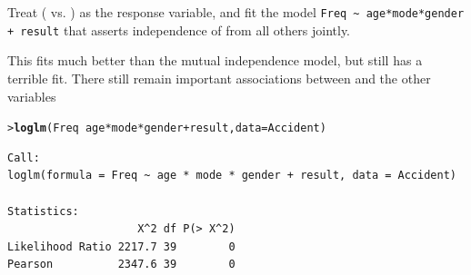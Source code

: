 \documentclass[10pt]{report}\usepackage[]{graphicx}\usepackage[]{color}
\makeatletter
\newcommand{\hlopt}[1]{\textcolor[rgb]{0,0,0}{#1}}%
\newcommand{\hlstd}[1]{\textcolor[rgb]{0.345,0.345,0.345}{#1}}%
\newcommand{\hlkwc}[1]{\textcolor[rgb]{0.333,0.667,0.333}{#1}}%
\newcommand{\hlkwd}[1]{\textcolor[rgb]{0.737,0.353,0.396}{\textbf{#1}}}%
\newenvironment{kframe}{%
 \def\at@end@of@kframe{}%
 \ifinner\ifhmode%
  \def\at@end@of@kframe{\end{minipage}}%
  \begin{minipage}{\columnwidth}%
 \fi\fi%
 \def\FrameCommand##1{\hskip\@totalleftmargin \hskip-\fboxsep
 \colorbox{shadecolor}{##1}\hskip-\fboxsep
     \hskip-\linewidth \hskip-\@totalleftmargin \hskip\columnwidth}%
 \MakeFramed {\advance\hsize-\width
   \@totalleftmargin\z@ \linewidth\hsize
   \@setminipage}}%
 {\par\unskip\endMakeFramed%
 \at@end@of@kframe}
\newenvironment{knitrout}{}{} %
\renewenvironment{knitrout}{\small\renewcommand{\baselinestretch}{.85}}{} %
\makeatother
\begin{document}
\begin{Exercises}
\begin{enumerate*}
\begin{ans}
\begin{knitrout}
\end{knitrout}
      \end{ans}
      
      \item Treat  ( vs. ) as the response variable, and fit the model \newline
      \verb|Freq ~ age*mode*gender + result| that asserts independence of  from all others jointly.
      \begin{ans}
      This fits much better than the mutual independence model, but still has a terrible fit.
      There still remain important associations between  and the other variables
\begin{knitrout}\footnotesize
{}\color{fgcolor}\begin{kframe}
\begin{alltt}
\hlstd{> }\hlkwd{loglm}\hlstd{(Freq} \hlopt{~} \hlstd{age} \hlopt{*} \hlstd{mode} \hlopt{*} \hlstd{gender} \hlopt{+} \hlstd{result,} \hlkwc{data} \hlstd{= Accident)}
\end{alltt}
\begin{verbatim}
Call:
loglm(formula = Freq ~ age * mode * gender + result, data = Accident)

Statistics:
                    X^2 df P(> X^2)
Likelihood Ratio 2217.7 39        0
Pearson          2347.6 39        0
\end{verbatim}
\end{kframe}
\end{knitrout}
      \end{ans}
      

\end{enumerate*}
\end{Exercises}
\end{document}
